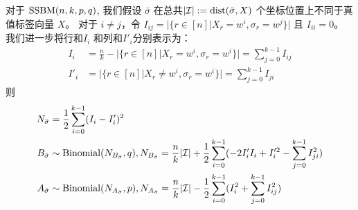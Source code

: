 \begin{lemma}\label{lem:minus}
	对于 $\operatorname{SSBM}(n,k,p,q)$,
  我们假设 $\bar{\sigma}$ 
  在总共$|\mathcal{I}|:=\operatorname{dist}(\bar{\sigma}, X)$ 
  个坐标位置上不同于真值标签向量
  $X$。
	对于 $i\neq j$，令 $I_{ij} = \Big|\{r\in [n] \big| X_r = w^i, \sigma_r = w^j \}\Big|$
  且 $I_{ii} = 0$。
  我们进一步将行和$I_i$
  和列和$I'_i$分别表示为：
  \begin{align}
  I_i &= \frac{n}{k} -
  \Big|\{r\in [n] \big| X_r = w^i, \sigma_r=w^i \}\Big|
  =
  \sum_{j=0}^{k-1} I_{ij} \label{eq:I_i_horizontal} \\
  I'_i &=
  \Big|\{r\in [n] \big| X_r \neq w^i,
  \sigma_r=w^i \}\Big|
  =\sum_{j=0}^{k-1} I_{ji}\label{eq:I_prime_i_vertical}
  \end{align}
	则
\begin{align}
	N_{\bar{\sigma}} &= \frac{1}{2}\sum_{i=0}^{k-1} (I_i - I_i')^2 \label{eq:N_w} \\
	B_{\bar{\sigma}} & \sim \operatorname{Binomial}(N_{B_{\bar{\sigma}}} , q),
  N_{B_{\bar{\sigma}}}=\frac{n}{k}|\mathcal{I}| + \frac{1}{2}\sum_{i=0}^{k-1}  (-2 I'_i I_i  + I'^2_i - \sum_{j=0}^{k-1} I^2_{ji})
  \label{eq:B_w}\\
	A_{\bar{\sigma}} &
  \sim \operatorname{Binomial}(N_{A_{\bar{\sigma}}}, p),
  N_{A_{\bar{\sigma}}}=
  \frac{n}{k}|\mathcal{I}| - \frac{1}{2}\sum_{i=0}^{k-1}
   (I^2_i + \sum_{j=0}^{k-1} I^2_{ij})
  \label{eq:A_w}
	\end{align}
\end{lemma}

